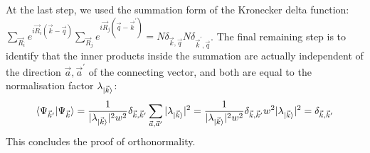 \documentclass{report}
\numberwithin{equation}{section}
\begin{document}
At the last step, we used the summation form of the Kronecker delta function: \(\sum_{\vec R_i}e^{i \vec R_i \left( \vec k - \vec q \right) }\sum_{\vec R_j}e^{i \vec R_j \left( \vec q - \vec k^\prime \right) } = N \delta_{\vec k,\vec q}N \delta_{\vec k^\prime,\vec q}\). The final remaining step is to identify that the inner products inside the summation are actually independent of the direction \(\vec a, \vec a^\prime\) of the connecting vector, and both are equal to the normalisation factor \(\lambda_{\ket{\vec k}}\):
\begin{equation}\begin{aligned}
	\braket{\Psi_{\vec k^\prime} | \Psi_{\vec k}} = \frac{1}{|\lambda_{\ket{\vec k}}|^2 w^2 } \delta_{\vec k, \vec k^\prime}\sum_{\vec a,\vec a^\prime} |\lambda_{\ket{\vec k}}|^2 = \frac{1}{|\lambda_{\ket{\vec k}}|^2 w^2 } \delta_{\vec k, \vec k^\prime}w^2 |\lambda_{\ket{\vec k}}|^2 = \delta_{\vec k, \vec k^\prime}
\end{aligned}\end{equation}
This concludes the proof of orthonormality.
\end{document}
